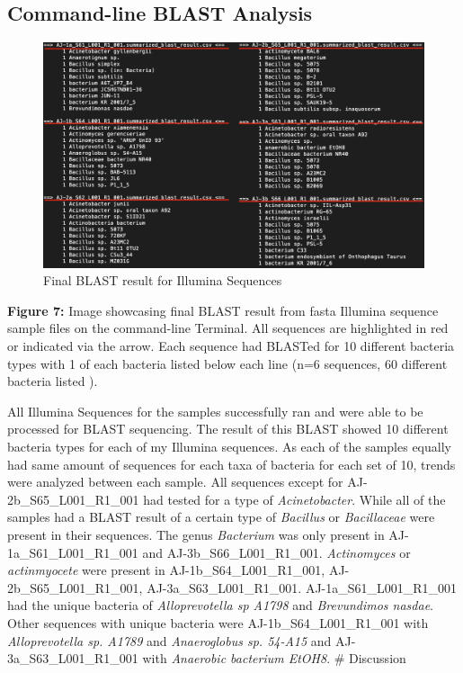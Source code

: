 \documentclass[]{article}
\begin{document}
\hypertarget{command-line-blast-analysis}{%
\subsection{Command-line BLAST
Analysis}\label{command-line-blast-analysis}}

\begin{figure}
\centering
\includegraphics{data/images/Illumina_BLAST_result/Illumina-Sequences-BLAST-Summary.png}
\caption{Final BLAST result for Illumina Sequences}
\end{figure}

\textbf{Figure 7:} Image showcasing final BLAST result from fasta
Illumina sequence sample files on the command-line Terminal. All
sequences are highlighted in red or indicated via the arrow. Each
sequence had BLASTed for 10 different bacteria types with 1 of each
bacteria listed below each line (n=6 sequences, 60 different bacteria
listed ).

All Illumina Sequences for the samples successfully ran and were able to
be processed for BLAST sequencing. The result of this BLAST showed 10
different bacteria types for each of my Illumina sequences. As each of
the samples equally had same amount of sequences for each taxa of
bacteria for each set of 10, trends were analyzed between each sample.
All sequences except for AJ-2b\_S65\_L001\_R1\_001 had tested for a type
of \emph{Acinetobacter}. While all of the samples had a BLAST result of
a certain type of \emph{Bacillus} or \emph{Bacillaceae} were present in
their sequences. The genus \emph{Bacterium} was only present in
AJ-1a\_S61\_L001\_R1\_001 and AJ-3b\_S66\_L001\_R1\_001.
\emph{Actinomyces} or \emph{actinmyocete} were present in
AJ-1b\_S64\_L001\_R1\_001, AJ-2b\_S65\_L001\_R1\_001,
AJ-3a\_S63\_L001\_R1\_001. AJ-1a\_S61\_L001\_R1\_001 had the unique
bacteria of \emph{Alloprevotella sp A1798} and \emph{Brevundimos
nasdae}. Other sequences with unique bacteria were
AJ-1b\_S64\_L001\_R1\_001 with \emph{Alloprevotella sp. A1789} and
\emph{Anaeroglobus sp. 54-A15} and AJ-3a\_S63\_L001\_R1\_001 with
\emph{Anaerobic bacterium EtOH8}. \# Discussion
\end{document}

